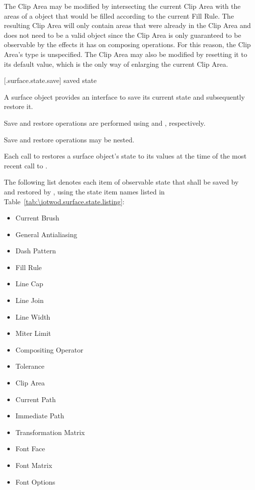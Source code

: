 \pnum
\enternote
The Clip Area may be modified by intersecting the current Clip Area with the areas of a  object that would be filled according to the current Fill Rule. The resulting Clip Area will only contain areas that were already in the Clip Area and does not need to be a valid  object since the Clip Area is only guaranteed to be observable by the effects it has on composing operations. For this reason, the Clip Area's type is unspecified. The Clip Area may also be modified by resetting it to its default value, which is the only way of enlarging the current Clip Area.
\exitnote

 [\iotwod.surface.state.save] { saved state}

\pnum
A surface object provides an interface to save its current state and subsequently restore it.

\pnum
Save and restore operations are performed using  and , respectively.

\pnum
Save and restore operations may be nested.

\pnum
Each call to  restores a surface object's state to its values at the time of the most recent call to .

\pnum
The following list denotes each item of observable state that shall be saved by  and restored by , using the state item names listed in Table~\ref{tab:\iotwod.surface.state.listing}:

\begin{itemize}
	\item Current Brush
	\item General Antialiasing
	\item Dash Pattern
	\item Fill Rule
	\item Line Cap
	\item Line Join
	\item Line Width
	\item Miter Limit
	\item Compositing Operator
	\item Tolerance
	\item Clip Area
	\item Current Path
	\item Immediate Path
	\item Transformation Matrix
	\item Font Face
	\item Font Matrix
	\item Font Options
\end{itemize}

